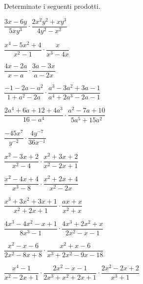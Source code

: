 \subsubsection*{}

\begin{esercizio}[*]
\label{ese:19.13}
Determinate i seguenti prodotti.
\begin{enumeratea}
\item \(\dfrac{3x-6y}{5xy^{3}} \cdot
\dfrac{2x^{2}y^{2}+xy^{3}}{4y^{2}-x^{2}}\)
\item \(\dfrac{x^{4}-5x^{2}+4}{x^{2}-1}\cdot\dfrac{x}{x^{3}-4x}\)
\item \(\dfrac{4x-2a}{x-a}\cdot\dfrac{3a-3x}{a-2x}\)
\item \(\dfrac{-1-2a-a^{2}}{1+a^{2}-2a}\cdot
\dfrac{a^{3}-3a^{2}+3a-1}{a^{4}+2a^{3}-2a-1}\)
\item \(\dfrac{2a^{4}+6a+12+4a^{3}}{16-a^{4}}\cdot
\dfrac{a^{2}-7a+10}{5a^{5}+15a^{2}}\)
\item \(\dfrac{-45x^{7}}{y^{-2}}\cdot\dfrac{4y^{-7}}{36x^{-1}}\)
\item \(\dfrac{x^{2}-3x+2}{x^{2}-4}\cdot\dfrac{x^{2}+3x+2}{x^{2}-2x+1}\)
\item \(\dfrac{x^{2}-4x+4}{x^{3}-8}\cdot\dfrac{x^{2}+2x+4}{x^{2}-2x}\)
\item \(\dfrac{x^{3}+3x^{2}+3x+1}{x^{2}+2x+1}\cdot \dfrac{ax+x}{x^{2}+x}\)
\item \(\dfrac{4x^{3}-4x^{2}-x+1}{8x^{3}-1}\cdot
\dfrac{4x^{3}+2x^{2}+x}{2x^{2}-x-1}\)
\item \(\dfrac{x^{2}-x-6}{2x^{2}-8x+8}\cdot
\dfrac{x^{2}+x-6}{x^{3}+2x^{2}-9x-18}\)
\item \(\dfrac{x^{4}-1}{x^{2}-2x+1}\cdot
\dfrac{2x^{2}-x-1}{2x^{3}+x^{2}+2x+1}\cdot
\dfrac{2x^{2}-2x+2}{x^{3}+1}\)
\end{enumeratea}
\end{esercizio}

